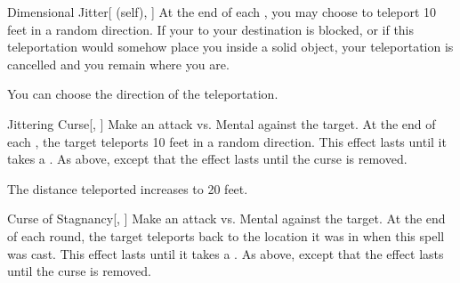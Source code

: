 \lowercase{\hypertarget{spell:Dimensional Jitter}{}}\label{spell:Dimensional Jitter}
\begin{attuneability}[Rank 5]{\hypertarget{spell:Dimensional Jitter}{Dimensional Jitter}}[ (self), ]
At the end of each , you may choose to teleport 10 feet in a random direction.
If your  to your destination is blocked, or if this teleportation would somehow place you inside a solid object, your teleportation is cancelled and you remain where you are.

\rankline
{} You can choose the direction of the teleportation.

\end{attuneability}
\vspace{0.25em}



\lowercase{\hypertarget{spell:Jittering Curse}{}}\label{spell:Jittering Curse}
\begin{freeability}[Rank 6]{\hypertarget{spell:Jittering Curse}{Jittering Curse}}[, ]
Make an attack vs. Mental against the target.
\hit At the end of each , the target teleports 10 feet in a random direction.
This effect lasts until it takes a .
\crit As above, except that the effect lasts until the curse is removed.

\rankline
{} The distance teleported increases to 20 feet.

\end{freeability}
\vspace{0.25em}



\lowercase{\hypertarget{spell:Curse of Stagnancy}{}}\label{spell:Curse of Stagnancy}
\begin{freeability}[Rank 8]{\hypertarget{spell:Curse of Stagnancy}{Curse of Stagnancy}}[, ]
Make an attack vs. Mental against the target.
\hit At the end of each round, the target teleports back to the location it was in
when this spell was cast.
This effect lasts until it takes a .
\crit As above, except that the effect lasts until the curse is removed.

\end{freeability}
\vspace{0.25em}




